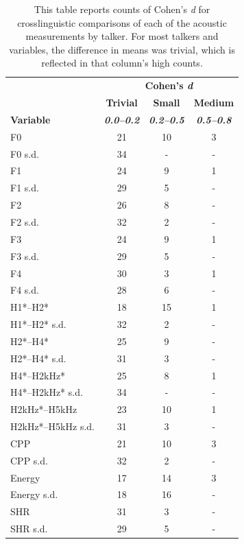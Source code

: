 \begin{table}[ptbh]
\caption{This table reports counts of Cohen's \textit{d} for crosslinguistic comparisons of each of the acoustic measurements by talker. For most talkers and variables, the difference in means was trivial, which is reflected in that column's high counts.}
\label{ch3:tab:cohend}
\centering
\begin{tabular}{lccc}
\toprule
         & \multicolumn{3}{c}{\textbf{Cohen's \textit{d}}} \\
         & \textbf{Trivial} & \textbf{Small} & \textbf{Medium} \\
\textbf{Variable} & \textbf{\textit{0.0--0.2}} & \textbf{\textit{0.2--0.5}} & \textbf{\textit{0.5--0.8}} \\ 
\midrule
F0	        &	21	&	10	&	3	\\
F0 s.d.	    &	34	&	-	&	-	\\
F1	        &	24	&	9	&	1	\\
F1 s.d.	    &	29	&	5	&	-	\\
F2	        &	26	&	8	&	-	\\
F2 s.d.	    &	32	&	2	&	-	\\
F3	        &	24	&	9	&	1	\\
F3 s.d.	    &	29	&	5	&	-	\\
F4	        &	30	&	3	&	1	\\
F4 s.d.	    &	28	&	6	&	-	\\
H1*--H2*	    &	18	&	15	&	1	\\
H1*--H2* s.d.	&	32	&	2	&	-	\\
H2*--H4*	    &	25	&	9	&	-	\\
H2*--H4* s.d.	&	31	&	3	&	-	\\
H4*--H2kHz* 	    &	25	&	8	&	1	\\
H4*--H2kHz* s.d.	&	34	&	-	&	-	\\
H2kHz*--H5kHz	    &	23	&	10	&	1	\\
H2kHz*--H5kHz s.d.	&	31	&	3	&	-	\\
CPP	        &	21	&	10	&	3	\\
CPP s.d.	&	32	&	2	&	-	\\
Energy	    &	17	&	14	&	3	\\
Energy s.d.	&	18	&	16	&	-	\\
SHR	        &	31	&	3	&	-	\\
SHR s.d.	&	29	&	5	&	- \\
\bottomrule
\end{tabular}
\end{table}

